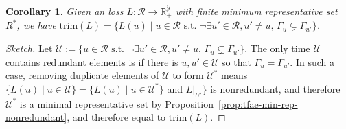 \documentclass[12pt]{article}
\newcommand{\Comments}{1}
\newcommand{\mynote}[2]{\ifnum\Comments=1\textcolor{#1}{#2}\fi}
\newcommand{\jessie}[1]{\mynote{teal}{[JF: #1]}}
\newcommand{\reals}{\mathbb{R}}
\newcommand{\R}{\mathcal{R}}
\newcommand{\U}{\mathcal{U}}
\newcommand{\Y}{\mathcal{Y}}
\newcommand{\risk}[1]{\underline{#1}}
\newcommand{\inter}[1]{\mathring{#1}}%
\newcommand{\trim}{\mathrm{trim}}
\newtheorem{corollary}{Corollary}
\begin{document}
\begin{corollary}\label{prop:trim-loss-condition}
  Given an loss $L : \R \to \reals^\Y_+$ with finite minimum representative set $R^*$, we have $\trim(L) = \{L(u) \mid u \in \R \textrm{ s.t. } \neg\exists u'\in\R,u'\neq u,\, \Gamma_u \subsetneq \Gamma_{u'}\}$.
\end{corollary}
\begin{proof}[Sketch]
  Let $\U := \{u \in \R \textrm{ s.t. } \neg\exists u'\in\R,u'\neq u,\, \Gamma_u \subsetneq \Gamma_{u'}\}$.
  The only time $\U$ contains redundant elements is if there is $u,u' \in \U$ so that $\Gamma_u = \Gamma_{u'}$.  In such a case, removing duplicate elements of $\U$ to form $\U^*$ means $\{L(u) \mid u \in \U\} = \{L(u) \mid u \in \U^*\}$ and $L|_{U'}\}$ is nonredundant, and therefore $\U^*$ is a minimal representative set by Proposition~\ref{prop:tfae-min-rep-nonredundant}, and therefore equal to $\trim(L)$.

  
\end{proof}
\end{document}

